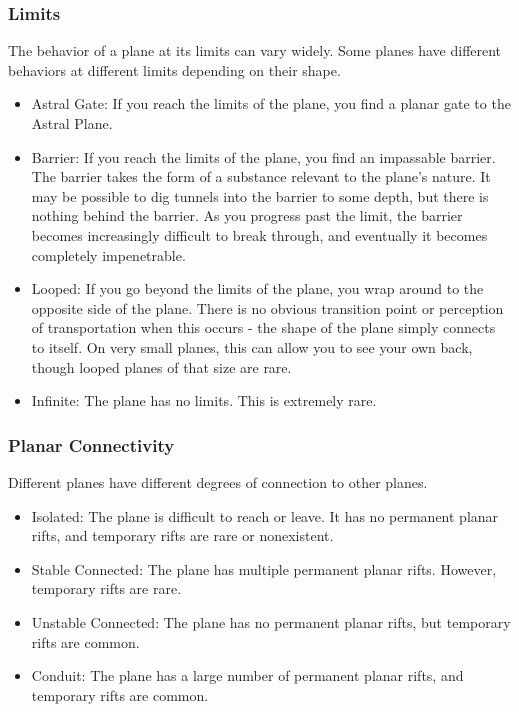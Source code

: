         \subsubsection{Limits} The behavior of a plane at its limits can vary widely.
            Some planes have different behaviors at different limits depending on their shape.
            \begin{itemize}
                \item Astral Gate: If you reach the limits of the plane, you find a planar gate to the Astral Plane.
                \item Barrier: If you reach the limits of the plane, you find an impassable barrier.
                    The barrier takes the form of a substance relevant to the plane's nature.
                    It may be possible to dig tunnels into the barrier to some depth, but there is nothing behind the barrier.
                    As you progress past the limit, the barrier becomes increasingly difficult to break through, and eventually it becomes completely impenetrable.
                \item Looped: If you go beyond the limits of the plane, you wrap around to the opposite side of the plane.
                    There is no obvious transition point or perception of transportation when this occurs - the shape of the plane simply connects to itself.
                    On very small planes, this can allow you to see your own back, though looped planes of that size are rare.
                \item Infinite: The plane has no limits. This is extremely rare.
            \end{itemize}

        \subsubsection{Planar Connectivity}
            Different planes have different degrees of connection to other planes.
            \begin{itemize}
                \item Isolated: The plane is difficult to reach or leave.
                    It has no permanent planar rifts, and temporary rifts are rare or nonexistent.
                \item Stable Connected: The plane has multiple permanent planar rifts.
                    However, temporary rifts are rare.
                \item Unstable Connected: The plane has no permanent planar rifts, but temporary rifts are common.
                \item Conduit: The plane has a large number of permanent planar rifts, and temporary rifts are common.
            \end{itemize}


